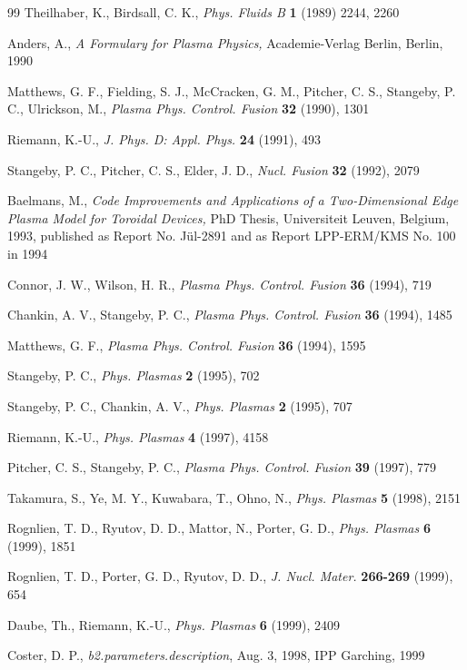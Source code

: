 \documentclass[11pt]{article}
\begin{document}
\begin{thebibliography}{99}
  \label{mpic89}Theilhaber, K., Birdsall, C. K., \textit{%
Phys. Fluids B }\textbf{1 }(1989) 2244, 2260

  \label{manders90}Anders, A., \textit{A Formulary for
Plasma Physics, }Academie-Verlag Berlin, Berlin, 1990

  \label{mmatt90}Matthews, G. F., Fielding, S. J.,
McCracken, G. M., Pitcher, C. S., Stangeby, P. C., Ulrickson, M., \textit{%
Plasma Phys. Control. Fusion }\textbf{32 }(1990), 1301

  \label{mriemann91}Riemann, K.-U., \textit{J. Phys. D:
Appl. Phys.} \textbf{24 }(1991), 493

  \label{mstanpitch}Stangeby, P. C., Pitcher, C. S.,
Elder, J. D., \textit{Nucl. Fusion }\textbf{32 }(1992), 2079

  \label{mbaelmans}Baelmans, M., \textit{Code Improvements
and Applications of a Two-Dimensional Edge Plasma Model for Toroidal
Devices, }PhD Thesis, Universiteit Leuven, Belgium, 1993, published as
Report No. J\"{u}l-2891 and as Report LPP-ERM/KMS No. 100 in 1994

  \label{mconnor}Connor, J. W., Wilson, H. R., \textit{%
Plasma Phys. Control. Fusion }\textbf{36 }(1994), 719

  \label{mchankin94}Chankin, A. V., Stangeby, P. C., 
\textit{Plasma Phys. Control. Fusion }\textbf{36 }(1994), 1485

  \label{mmatt94}Matthews, G. F., \textit{Plasma Phys.
Control. Fusion }\textbf{36 }(1994), 1595

  \label{mbohm95}Stangeby, P. C., \textit{Phys. Plasmas }%
\textbf{2 }(1995), 702

  \label{mstangeby95}Stangeby, P. C., Chankin, A. V., 
\textit{Phys. Plasmas }\textbf{2 }(1995), 707

  \label{mriemann97}Riemann, K.-U., \textit{Phys. Plasmas 
}\textbf{4 }(1997), 4158

  \label{mpitch97}Pitcher, C. S., Stangeby, P. C., \textit{%
Plasma Phys. Control. Fusion }\textbf{39 }(1997), 779

  \label{mtakamura}Takamura, S., Ye, M. Y., Kuwabara, T.,
Ohno, N., \textit{Phys. Plasmas }\textbf{5 }(1998), 2151

  \label{mrognlien1}Rognlien, T. D., Ryutov, D. D.,
Mattor, N., Porter, G. D., \textit{Phys. Plasmas }\textbf{6 }(1999), 1851

  \label{mrognlien2}Rognlien, T. D., Porter, G. D.,
Ryutov, D. D., \textit{J. Nucl. Mater.} \textbf{266-269} (1999), 654

  \label{mdaube99}Daube, Th., Riemann, K.-U., \textit{Phys.
Plasmas }\textbf{6 }(1999), 2409

  \label{mcoster}Coster, D. P., \textit{%
b2.parameters.description}, Aug. 3, 1998, IPP Garching, 1999
\end{thebibliography}
\end{document}
